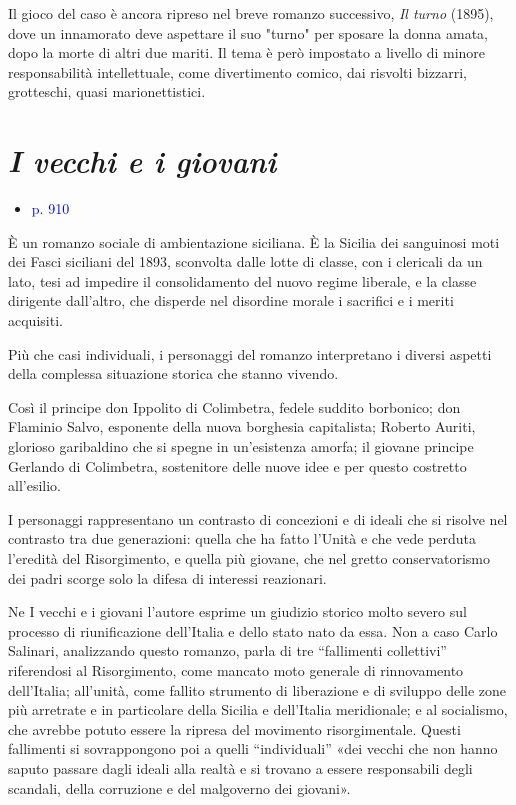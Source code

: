 \documentclass[a4paper, twoside, titlepage]{book}
\newcommand{\elenco}[1]{%
\begin{itemize}
#1
\end{itemize}}
\renewcommand{\emph}[1]{\textcolor{blue}{#1}}
\begin{document}
Il gioco del caso è ancora ripreso nel breve romanzo successivo, \textit{Il turno} (1895), dove un innamorato deve aspettare il suo "turno" per sposare la donna amata, dopo la morte di altri due mariti. Il tema è però impostato a livello di minore responsabilità intellettuale, come divertimento comico, dai risvolti bizzarri, grotteschi, quasi marionettistici.

\section{\textit{I vecchi e i giovani}}
\elenco{\item \emph{p. 910}}

È un romanzo sociale di ambientazione siciliana. È la Sicilia dei sanguinosi moti dei Fasci siciliani del 1893, sconvolta dalle lotte di classe, con i clericali da un lato, tesi ad impedire il consolidamento del nuovo regime liberale, e la classe dirigente dall'altro, che disperde nel disordine morale i sacrifici e i meriti acquisiti.

Più che casi individuali, i personaggi del romanzo interpretano i diversi aspetti della complessa situazione storica che stanno vivendo.

Così il principe don Ippolito di Colimbetra, fedele suddito borbonico; don Flaminio Salvo, esponente della nuova borghesia capitalista; Roberto Auriti, glorioso garibaldino che si spegne in un'esistenza amorfa; il giovane principe Gerlando di Colimbetra, sostenitore delle nuove idee e per questo costretto all'esilio.

I personaggi rappresentano un contrasto di concezioni e di ideali che si risolve nel contrasto tra due generazioni: quella che ha fatto l'Unità e che vede perduta l'eredità del Risorgimento, e quella più giovane, che nel gretto conservatorismo dei padri scorge solo la difesa di interessi reazionari.

Ne I vecchi e i giovani l'autore esprime un giudizio storico molto severo sul processo di riunificazione dell'Italia e dello stato nato da essa. Non a caso Carlo Salinari, analizzando questo romanzo, parla di tre “fallimenti collettivi” riferendosi al Risorgimento, come mancato moto generale di rinnovamento dell'Italia; all'unità, come fallito strumento di liberazione e di sviluppo delle zone più arretrate e in particolare della Sicilia e dell'Italia meridionale; e al socialismo, che avrebbe potuto essere la ripresa del movimento risorgimentale. Questi fallimenti si sovrappongono poi a quelli “individuali” «dei vecchi che non hanno saputo passare dagli ideali alla realtà e si trovano a essere responsabili degli scandali, della corruzione e del malgoverno dei giovani».
\end{document}
